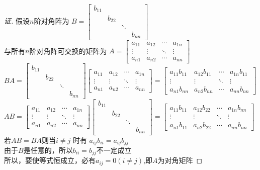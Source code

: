 \documentclass[10pt,a4paper]{report}
\begin{document}
\begin{proof}[证]
	假设$n$阶对角阵为
	$B=
	\left[
	\begin{matrix}
	b_{11} & \\
	   	   &b_{22}\\
	   	   & & \ddots\\
	   	   & & & b_{nn}
	\end{matrix}
	\right]
	$\\
	与所有$n$阶对角阵可交换的矩阵为
	$A=
	\left[
	\begin{matrix}
	a_{11} & a_{12} & \cdots & a_{1n}\\
	\vdots & \vdots & \ddots & \vdots\\
	a_{n1} & a_{n2} & \cdots & a_{nn}
	\end{matrix}
	\right]
	$\\
	$
	BA = 
	\left[
	\begin{matrix}
	b_{11} & \\
	&b_{22}\\
	& & \ddots\\
	& & & b_{nn}
	\end{matrix}
	\right]
	\left[
	\begin{matrix}
	a_{11} & a_{12} & \cdots & a_{1n}\\
	\vdots & \vdots & \ddots & \vdots\\
	a_{n1} & a_{n2} & \cdots & a_{nn}
	\end{matrix}
	\right] = 
	\left[
	\begin{matrix}
	a_{11}b_{11} & a_{12}b_{11} & \cdots & a_{1n}b_{11}\\
	\vdots & \vdots & \ddots & \vdots\\
	a_{n1}b_{nn} & a_{n2}b_{nn} & \cdots & a_{nn}b_{nn}
	\end{matrix}
	\right]
	$\\
	$
	AB = 
	\left[
	\begin{matrix}
	a_{11} & a_{12} & \cdots & a_{1n}\\
	\vdots & \vdots & \ddots & \vdots\\
	a_{n1} & a_{n2} & \cdots & a_{nn}
	\end{matrix}
	\right]
	\left[
	\begin{matrix}
	b_{11} & \\
	&b_{22}\\
	& & \ddots\\
	& & & b_{nn}
	\end{matrix}
	\right]=
	\left[
	\begin{matrix}
	a_{11}b_{11} & a_{12}b_{22} & \cdots & a_{1n}b_{nn}\\
	\vdots & \vdots & \ddots & \vdots\\
	a_{n1}b_{11} & a_{n2}b_{22} & \cdots & a_{nn}b_{nn}
	\end{matrix}
	\right]
	$
	若$AB=BA$则当$i \neq j$ 时有
	$
	a_{ij}b_{ii} = a_{ij}b_{jj}
	$\\
	由于$B$是任意的，所以$b_{ii} = b_{jj}$不一定成立\\
	所以，要使等式恒成立，必有$a_{ij} = 0 (i \neq j)$,即$A$为对角矩阵
\end{proof}
\end{document}
